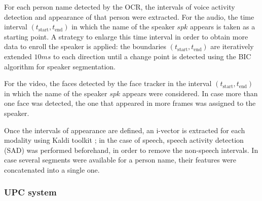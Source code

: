 For each person name detected by the OCR, the intervals of voice activity detection and appearance of that person were extracted. For the audio, 
the time interval $(t_{\mathrm{start}},t_{\mathrm{end}})$ in which the name of the speaker $spk$ appears is taken as a starting point. A strategy to enlarge this time
 interval in order to obtain more data to enroll the speaker is applied: the boundaries $(t_{\mathrm{start}},t_{\mathrm{end}})$ are iteratively extended $10ms$ to each direction until a change point is detected using the BIC algorithm
for speaker segmentation.
%
% 

For the video, the faces detected by the face tracker in the interval $(t_{\mathrm{start}},t_{\mathrm{end}})$ in 
 which the name of the speaker $spk$ appears were considered.
 In case more than one face was detected, the one that appeared in more frames was assigned to the speaker.
 
 Once the intervals of appearance are defined, an i-vector \cite{dehak10} is extracted for each modality using Kaldi toolkit \cite{kaldi}; in the case of speech, speech activity detection (SAD) was performed beforehand, in order to remove the non-speech intervals. In case several segments were available for a person name, their features were concatenated into a single one.

\subsubsection{UPC system}

